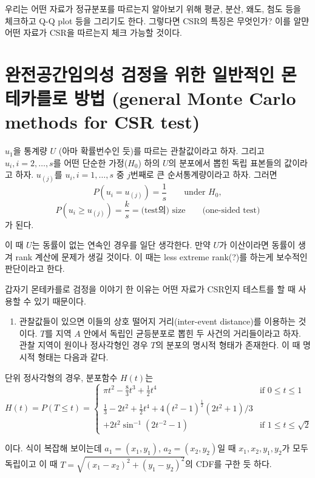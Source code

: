 \documentclass[b5paper,]{book}
\providecommand{\tightlist}{%
  \setlength{\itemsep}{0pt}\setlength{\parskip}{0pt}}
\theoremstyle{definition}
\theoremstyle{definition}
\theoremstyle{definition}
\theoremstyle{remark}
\begin{document}
우리는 어떤 자료가 정규분포를 따르는지 알아보기 위해 평균, 분산, 왜도,
첨도 등을 체크하고 Q-Q plot 등을 그리기도 한다. 그렇다면 CSR의 특징은
무엇인가? 이를 알먄 어떤 자료가 CSR을 따르는지 체크 가능할 것이다.

\section{완전공간임의성 검정을 위한 일반적인 몬테카를로 방법 (general
Monte Carlo methods for CSR
test)}\label{------general-monte-carlo-methods-for-csr-test}

\(u_{1}\)을 통계량 \(U\) (아마 확률번수인 듯)를 따르는 관찰값이라고
하자. 그리고 \(u_{i}, i =2,\ldots, s\)를 어떤 단순한 가정(\(H_{0}\))
하의 \(U\)의 분포에서 뽑힌 독립 표본들의 값이라고 하자. \(u_{(j)}\)를
\(u_{i}, i=1,\ldots , s\) 중 \(j\)번째로 큰 순서통계량이라고 하자.
그러면 \[P(u_{i}=u_{(j)})=\frac{1}{s} \qquad{\text{under } H_{0}},\]
\[P(u_{i}\geq u_{(j)})=\frac{k}{s}=\text{(test의) size} \qquad{\text{(one-sided test)}}\]
가 된다.

이 때 \(U\)는 동률이 없는 연속인 경우를 일단 생각한다. 만약 \(U\)가
이산이라면 동률이 생겨 rank 계산에 문제가 생길 것이다. 이 때는 less
extreme rank(?)를 하는게 보수적인 판단이라고 한다.

갑자기 몬테카를로 검정을 이야기 한 이유는 어떤 자료가 CSR인지 테스트를
할 때 사용할 수 있기 때문이다.

\begin{enumerate}
\def\labelenumi{\arabic{enumi}.}
\tightlist
\item
  관찰값들이 있으면 이들의 상호 떨어지 거리(inter-event distance)를
  이용하는 것이다. \(T\)를 지역 \(A\) 안에서 독립인 균등분포로 뽑힌 두
  사건의 거리들이라고 하자. 관찰 지역이 원이나 정사각형인 경우 \(T\)의
  분포의 명시적 형태가 존재한다. 이 때 명시적 형태는 다음과 같다.
\end{enumerate}

단위 정사각형의 경우, 분포함수 \(H(t)\)는 \[
H(t)=P(T\leq t) =
\begin{cases}
\pi t^{2}-\frac{8}{3}t^{3}+\frac{1}{2}t^{4} & \text{if $0 \leq t \leq 1$}\\
\frac{1}{3} -2t^{2} + \frac{1}{2}t^{4} + 4(t^{2}-1)^{\frac{1}{2}}(2t^{2}+1)/3\\
+ 2t^{2}\sin^{-1}(2t^{-2}-1) & \text{if $1\leq t \leq \sqrt{2}$}
\end{cases}
\]

이다. 식이 복잡해 보이는데 \(a_{1}=(x_{1},y_{1})\),
\(a_{2}=(x_{2},y_{2})\)일 때 \(x_{1}, x_{2}, y_{1}, y_{2}\)가 모두
독립이고 이 때 \(T=\sqrt{(x_{1}-x_{2})^{2}+(y_{1}-y_{2})^{2}}\)의 CDF를
구한 듯 하다.
\end{document}
